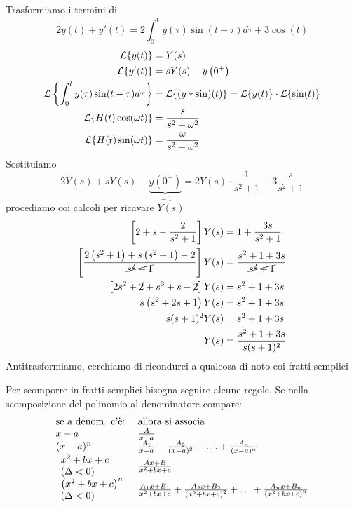 Trasformiamo i termini di
\begin{equation*}
2y(t) + y'(t) = 2\int^{t}_{0} y(\tau)\sin(t - \tau) d\tau + 3\cos(t)
\end{equation*}
\begin{align*}
\mathcal{L}\{y(t)\} & = Y(s)\\
\mathcal{L}\{y'(t)\} & = sY(s) - y\left(0^{+}\right)\\
\mathcal{L}\left\{\int^{t}_{0} y(\tau)\sin(t - \tau) d\tau \right\} & = \mathcal{L}\{(y*\sin)(t)\} = \mathcal{L}\{y(t)\} \cdot \mathcal{L}\{\sin(t)\}\\
\mathcal{L}\{H(t)\cos(\omega t)\} & = \frac{s}{s^{2} + \omega^{2}}\\
\mathcal{L}\{H(t)\sin(\omega t)\} & = \frac{\omega}{s^{2} + \omega^{2}}
\end{align*}
Sostituiamo
\begin{equation*}
2Y(s) + sY(s) - \underbrace{y\left(0^{+}\right)}_{= 1} = 2Y(s) \cdot \frac{1}{s^{2} + 1} + 3\frac{s}{s^{2} + 1}
\end{equation*}
procediamo coi calcoli per ricavare $Y(s)$
\begin{align*}
\left[ 2 + s - \frac{2}{s^{2} + 1}\right] Y(s) & = 1 + \frac{3s}{s^{2} + 1}\\
\left[\frac{2\left(s^{2} + 1\right) + s\left(s^{2} + 1\right) - 2}{\cancel{s^{2} + 1}}\right] Y(s) & = \frac{s^{2} + 1 + 3s}{\cancel{s^{2} + 1}}\\
\left[ 2s^{2} + \cancel{2} + s^{3} + s - \cancel{2}\right] Y(s) & = s^{2} + 1 + 3s\\
s\left(s^{2} + 2s + 1\right) Y(s) & = s^{2} + 1 + 3s\\
s(s + 1)^{2} Y(s) & = s^{2} + 1 + 3s\\
Y(s) & = \frac{s^{2} + 1 + 3s}{s(s + 1)^{2}}
\end{align*}
Antitrasformiamo, cerchiamo di ricondurci a qualcosa di noto coi fratti semplici
\begin{rem}
Per scomporre in fratti semplici bisogna seguire alcune regole. Se nella scomposizione del polinomio al denominatore compare:
\begin{equation*}
\begin{array}{l l}
\text{se a denom. c'è:} & \text{allora si associa}\\
x - a & \frac{A}{x - a}\\
(x - a)^{n} & \frac{A_{1}}{x - a} + \frac{A_{2}}{(x - a)^{2}} + \dotsc + \frac{A_{n}}{(x - a)^{n}}\\
\begin{array}{l}
x^{2} + bx + c\\
(\Delta < 0)
\end{array} & \frac{Ax + B}{x^{2} + bx + c}\\
\begin{array}{l}
\left(x^{2} + bx + c\right)^{n}\\
(\Delta < 0)
\end{array} & \frac{A_{1} x + B_{1}}{x^{2} + bx + c} + \frac{A_{2} x + B_{2}}{\left(x^{2} + bx + c\right)^{2}} + \dotsc + \frac{A_{n} x + B_{n}}{\left(x^{2} + bx + c\right)^{n}}
\end{array}
\end{equation*}
\end{rem}
